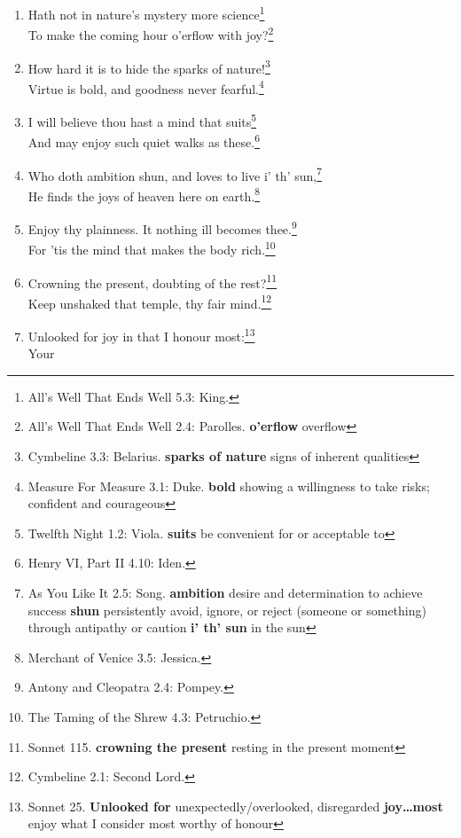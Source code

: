 \documentclass[17pt,twoside]{extarticle}
\begin{document}
\begin{enumerate}
  Enforce attention like deep harmony;\footnote{Richard II 2.1: Gaunt.
    \textbf{enforce} cause (something) to happen by necessity}\\You
  shall find your safety manifested.\footnote{Measure For Measure 4.3:
    Duke. \textbf{manifested} clear or obvious to the eye or mind}
\item
  Hath not in nature's mystery more science\footnote{All's Well That
    Ends Well 5.3: King.}\\To make the coming hour o'erflow with
  joy?\footnote{All's Well That Ends Well 2.4: Parolles.
    \textbf{o'erflow} overflow}
\item
  How hard it is to hide the sparks of nature!\footnote{Cymbeline 3.3:
    Belarius. \textbf{sparks of nature} signs of inherent qualities}\\Virtue
  is bold, and goodness never fearful.\footnote{Measure For Measure 3.1:
    Duke. \textbf{bold} showing a willingness to take risks; confident
    and courageous}
\item
  I will believe thou hast a mind that suits\footnote{Twelfth Night 1.2:
    Viola. \textbf{suits} be convenient for or acceptable to}\\And may
  enjoy such quiet walks as these.\footnote{Henry VI, Part II 4.10:
    Iden.}
\item
  Who doth ambition shun, and loves to live i' th' sun,\footnote{As You
    Like It 2.5: Song. \textbf{ambition} desire and determination to
    achieve success \textbf{shun} persistently avoid, ignore, or reject
    (someone or something) through antipathy or caution \textbf{i' th'
    sun} in the sun}\\He finds the joys of heaven here on
  earth.\footnote{Merchant of Venice 3.5: Jessica.}
\item
  Enjoy thy plainness. It nothing ill becomes thee.\footnote{Antony and
    Cleopatra 2.4: Pompey.}\\For 'tis the mind that makes the body
  rich.\footnote{The Taming of the Shrew 4.3: Petruchio.}
\item
  Crowning the present, doubting of the rest?\footnote{Sonnet 115.
    \textbf{crowning the present} resting in the present moment}\\Keep
  unshaked that temple, thy fair mind.\footnote{Cymbeline 2.1: Second
    Lord.}
\item
  Unlooked for joy in that I honour most:\footnote{Sonnet 25.
    \textbf{Unlooked for} unexpectedly/overlooked, disregarded
    \textbf{joy\ldots{}most} enjoy what I consider most worthy of honour}\\Your

\end{enumerate}
\end{document}
